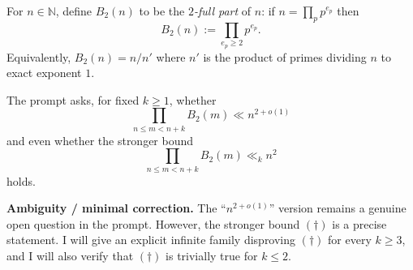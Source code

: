 For $n\in\mathbb{N}$, define $B_2(n)$ to be the \emph{$2$-full part} of $n$: if $n=\prod_p p^{e_p}$ then
\[
B_2(n) := \prod_{e_p\ge 2} p^{e_p}.
\]
Equivalently, $B_2(n)=n/n'$ where $n'$ is the product of primes dividing $n$ to exact exponent $1$.

The prompt asks, for fixed $k\ge 1$, whether
\[
\prod_{n\le m<n+k} B_2(m) \ll n^{2+o(1)}
\]
and even whether the stronger bound
\[
\prod_{n\le m<n+k} B_2(m) \ll_k n^{2}
\tag{$\dagger$}
\]
holds.

\textbf{Ambiguity / minimal correction.} The ``$n^{2+o(1)}$'' version remains a genuine open question in the prompt. However, the stronger bound $(\dagger)$ is a precise statement. I will give an explicit infinite family disproving $(\dagger)$ for every $k\ge 3$, and I will also verify that $(\dagger)$ is trivially true for $k\le 2$.
